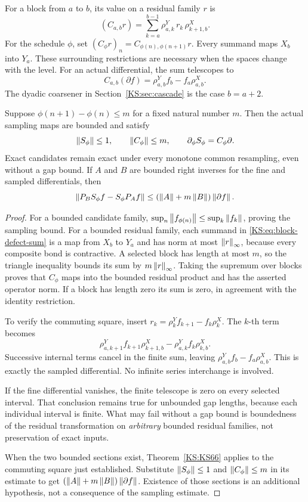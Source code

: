 For a block from \(a\) to \(b\), its value on a residual family \(r\) is
\begin{equation}\label{KS:eq:block-defect-sum}
 (C_{a,b}r)=\sum_{k=a}^{b-1}
 \rho^Y_{a,k}\,r_k\,\rho^X_{k+1,b}.
\end{equation}
For the schedule \(\phi\), set \((C_\phi r)_n=C_{\phi(n),\phi(n+1)}r\). Every summand maps \(X_b\) into \(Y_a\). These surrounding restrictions are necessary when the spaces change with the level. For an actual differential, the sum telescopes to
\[
 C_{a,b}(\partial f)=\rho^Y_{a,b}f_b-f_a\rho^X_{a,b}.
\]
The dyadic coarsener in Section~\ref{KS:sec:cascade} is the case \(b=a+2\).

\begin{KStheorem}\label{KS:KS67}
Suppose \(\phi(n+1)-\phi(n)\le m\) for a fixed natural number \(m\). Then the actual sampling maps are bounded and satisfy
\[
 \left\lVert S_\phi\right\rVert\le1,\qquad \left\lVert C_\phi\right\rVert\le m,
 \qquad \partial_\phi S_\phi=C_\phi\partial.
\]
Exact candidates remain exact under every monotone common resampling, even without a gap bound. If \(A\) and \(B\) are bounded right inverses for the fine and sampled differentials, then
\[
 \left\lVert P_BS_\phi f-S_\phi P_Af\right\rVert
 \le(\left\lVert A\right\rVert+m\left\lVert B\right\rVert)\left\lVert\partial f\right\rVert.
\]
\end{KStheorem}
\begin{proof}
For a bounded candidate family, \(\sup_n\left\lVert f_{\phi(n)}\right\rVert\le\sup_k\left\lVert f_k\right\rVert\), proving the sampling bound. For a bounded residual family, each summand in \eqref{KS:eq:block-defect-sum} is a map from \(X_b\) to \(Y_a\) and has norm at most \(\left\lVert r\right\rVert_\infty\), because every composite bond is contractive. A selected block has length at most \(m\), so the triangle inequality bounds its sum by \(m\left\lVert r\right\rVert_\infty\). Taking the supremum over blocks proves that \(C_\phi\) maps into the bounded residual product and has the asserted operator norm. If a block has length zero its sum is zero, in agreement with the identity restriction.

To verify the commuting square, insert
\(r_k=\rho^Y_kf_{k+1}-f_k\rho^X_k\). The \(k\)-th term becomes
\[
 \rho^Y_{a,k+1}f_{k+1}\rho^X_{k+1,b}
 -\rho^Y_{a,k}f_k\rho^X_{k,b}.
\]
Successive internal terms cancel in the finite sum, leaving \(\rho^Y_{a,b}f_b-f_a\rho^X_{a,b}\). This is exactly the sampled differential. No infinite series interchange is involved.

If the fine differential vanishes, the finite telescope is zero on every selected interval. That conclusion remains true for unbounded gap lengths, because each individual interval is finite. What may fail without a gap bound is boundedness of the residual transformation on \emph{arbitrary} bounded residual families, not preservation of exact inputs.

When the two bounded sections exist, Theorem~\ref{KS:KS66} applies to the commuting square just established. Substitute \(\left\lVert S_\phi\right\rVert\le1\) and \(\left\lVert C_\phi\right\rVert\le m\) in its estimate to get \((\left\lVert A\right\rVert+m\left\lVert B\right\rVert)\left\lVert\partial f\right\rVert\). Existence of those sections is an additional hypothesis, not a consequence of the sampling estimate.
\end{proof}
